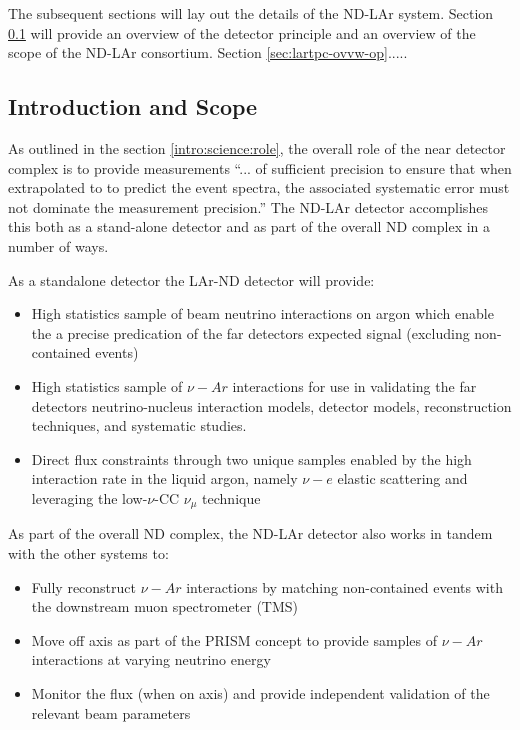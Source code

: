 The subsequent sections will lay out the details of the ND-LAr system. Section \ref{sec:lartpc-ovvw-intro} will provide an overview of the detector principle and an overview of the scope of the ND-LAr consortium. Section \ref{sec:lartpc-ovvw-op}.....



\subsection{Introduction and Scope}\label{sec:lartpc-ovvw-intro}


As outlined in the section \ref{intro:science:role}, the overall role of the near detector complex is to provide measurements  ``... of sufficient precision to ensure that when extrapolated to  to predict the  event spectra, the associated systematic error must not dominate the measurement precision.'' The ND-LAr detector accomplishes this both as a stand-alone detector and as part of the overall ND complex in a number of ways.

As a standalone detector the LAr-ND detector will provide:
\begin{itemize}
    \item High statistics sample of beam neutrino interactions on argon which enable the a precise predication of the far detectors expected signal (excluding non-contained events) 
    \item High statistics sample of $\nu-Ar$ interactions for use in validating the far detectors neutrino-nucleus interaction models, detector models, reconstruction techniques, and systematic studies.
    \item Direct flux constraints through two unique samples enabled by the high interaction rate in the liquid argon, namely $\nu-e$ elastic scattering and leveraging the low-$\nu$-CC $\nu_\mu$ technique
\end{itemize}

As part of the overall ND complex, the ND-LAr detector also works in tandem with the other systems to:

\begin{itemize}
    \item Fully reconstruct $\nu-Ar$ interactions by matching non-contained events with the downstream muon spectrometer (TMS)
    \item Move off axis as part of the PRISM concept to provide samples of $\nu-Ar$ interactions at varying neutrino energy
    \item Monitor the flux (when on axis) and provide independent validation of the relevant beam parameters %
\end{itemize}


